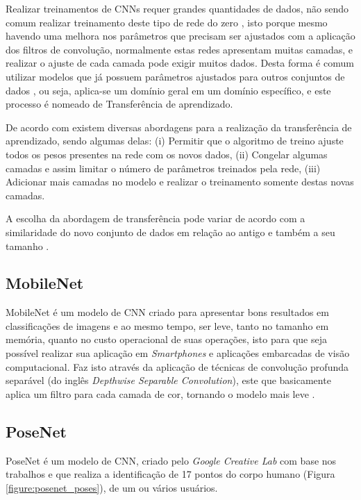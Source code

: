 \par Realizar treinamentos de CNNs requer grandes quantidades de dados, não sendo comum realizar treinamento deste tipo de rede do zero \cite{Carneiro2017}, isto porque mesmo havendo uma melhora nos parâmetros que precisam ser ajustados com a aplicação dos filtros de convolução, normalmente estas redes apresentam muitas camadas, e realizar o ajuste de cada camada pode exigir muitos dados. Desta forma é comum utilizar modelos que já possuem parâmetros ajustados para outros conjuntos de dados \cite{Ponti2018}, ou seja, aplica-se um domínio geral em um domínio específico, e este processo é nomeado de Transferência de aprendizado.

\par De acordo com  existem diversas abordagens para a realização da transferência de aprendizado, sendo algumas delas: (i) Permitir que o algoritmo de treino ajuste todos os pesos presentes na rede com os novos dados, (ii) Congelar algumas camadas e assim limitar o número de parâmetros treinados pela rede, (iii) Adicionar mais camadas no modelo e realizar o treinamento somente destas novas camadas.

\par A escolha da abordagem de transferência pode variar de acordo com a similaridade do novo conjunto de dados em relação ao antigo e também a seu tamanho \cite{Carneiro2017}.

\subsection{MobileNet}

\par MobileNet é um modelo de CNN criado para apresentar bons resultados em classificações de imagens e ao mesmo tempo, ser leve, tanto no tamanho em memória, quanto no custo operacional de suas operações, isto para que seja possível realizar sua aplicação em \textit{Smartphones} e aplicações embarcadas de visão computacional. Faz isto através da aplicação de técnicas de convolução profunda separável (do inglês \textit{Depthwise Separable Convolution}), este que basicamente aplica um filtro para cada camada de cor, tornando o modelo mais leve \cite{howard2017mobilenets}.

\subsection{PoseNet}

\par PoseNet é um modelo de CNN, criado pelo \textit{Google Creative Lab} com base nos trabalhos  e  que realiza a identificação de 17 pontos do corpo humano (Figura \ref{figure:posenet_poses}), de um ou vários usuários.

